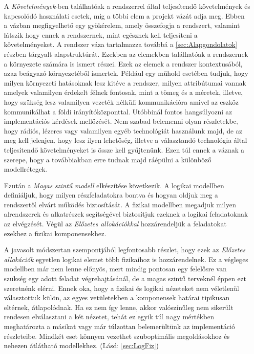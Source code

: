         A \emph{Követelmények}-ben találhatóak a rendszerrel által teljesítendő követelmények és kapcsolódó használati esetek, míg a többi elem a projekt vázát adja meg. Ebben a vázban megfigyelhető egy gyökérelem, amely összefogja a rendszert, valamint látszik hogy ennek a rendszernek, mint egésznek kell teljesíteni a követelményeket.
        A rendszer váza tartalmazza továbbá a \ref{sec:Alapgondolatok} részben tárgyalt alapstruktúrát.
        Ezekben az elemekben találhatóak a rendszernek a környezete számára is ismert részei. Ezek az elemek a rendszer kontextusából, azaz beágyazó környezetéből ismertek.
        Például egy műhold esetében tudjuk, hogy milyen környezeti hatásoknak lesz kitéve a rendszer, milyen attribútumai vannak amelyek valamilyen érdekelt félnek fontosak, mint a tömeg és a méretek, illetve, hogy szükség lesz valamilyen vezeték nélküli kommunikációra amivel az eszköz kommunikálhat a földi irányítóközponttal. Utóbbinál fontos hangsúlyozni az implementációs kérdések mellőzését. Nem szabad belemenni olyan részletekbe, hogy rádiós, lézeres vagy valamilyen egyéb technológiát használunk majd, de az meg kell jelenjen, hogy lesz ilyen lehetőség, illetve a választandó technológia által teljesítendő követelményeket is össze kell gyűjtenünk. 
        Ezen túl ennek a váznak a szerepe, hogy a továbbiakban erre tudnak majd ráépülni a különböző modellrétegek.

        Ezután a \emph{Magas szintű modell} elkészítése következik. A logikai modellben definiáljuk, hogy milyen részfeladatokra bontva és hogyan oldjuk meg a rendszertől elvárt működés biztosítását.
        A fizikai modellben megadjuk milyen alrendszerek és alkatrészek segítségével biztosítjuk ezeknek a logikai feladatoknak az elvégzését.
        Végül az \emph{Előzetes allokációkkal} hozzárendeljük a feladatokat ezekhez a fizikai komponensekhez.
        
        A javasolt módszertan szempontjából legfontosabb részlet, hogy ezek az \emph{Előzetes allokációk} egyetlen logikai elemet több fizikaihoz is hozzárendelnek. Ez a végleges modellben már nem lenne előnyös, mert mindig pontosan egy felelősre van szükség egy adott feladat végrehajtásánál, de a magas szintű terveknél éppen ezt szeretnénk elérni.
        Ennek oka, hogy a fizikai és logikai nézeteket nem véletlenül választottuk külön, az egyes vetületekben a komponensek határai tipikusan eltérnek, átlapolódnak.
        Ha ez nem így lenne, akkor valószínűleg nem sikerült rendesen elválasztani a két nézetet, tehát ez egyik túl nagy mértékben meghatározta a másikat vagy már túlzottan belemerültünk az implementáció részleteibe. Mindkét eset könnyen vezethet szuboptimális megoldásokhoz és nehezen átlátható modellekhez. (Lásd: \ref{sec:LogFiz})
        
